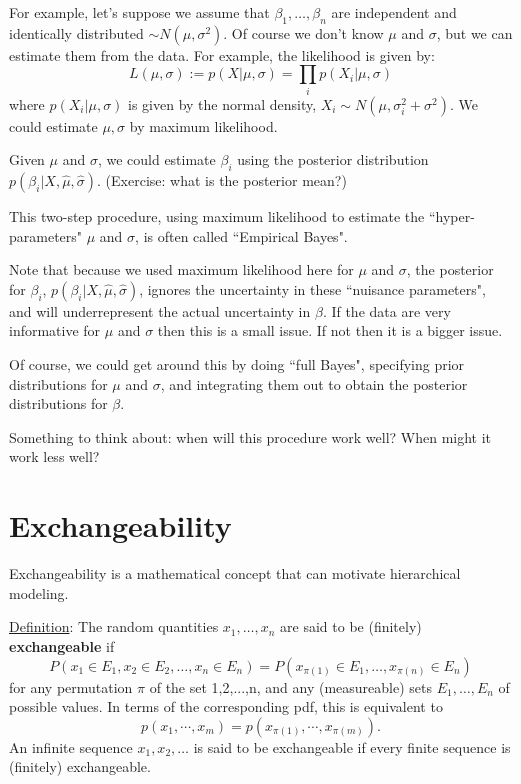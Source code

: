 \documentclass{article}
\begin{document}
 For example, let's suppose we assume that $\beta_1,\dots,\beta_n$ are independent and identically distributed $\sim N(\mu,\sigma^2)$. Of course
 we don't know $\mu$ and $\sigma$, but we can estimate them from the data.
 For example, the likelihood is given by:
 \begin{equation}
 L(\mu,\sigma) := p(X | \mu,\sigma) = \prod_i p(X_i | \mu, \sigma)
 \end{equation}
 where $p(X_i | \mu, \sigma)$ is given by the normal density, $X_i \sim N(\mu,\sigma_i^2 + \sigma^2)$. 
 We could estimate $\mu, \sigma$ by maximum likelihood.
 
 Given $\mu$ and $\sigma$, we could estimate $\beta_i$ using the posterior distribution $p(\beta_i | X, \hat\mu, \hat\sigma)$. (Exercise: what is the posterior mean?)
 
 This two-step procedure, using maximum likelihood to estimate the ``hyper-parameters" $\mu$ and $\sigma$, is often called ``Empirical Bayes".
 
 Note that because we used
 maximum likelihood here for $\mu$ and $\sigma$, the posterior for $\beta_i$, $p(\beta_i | X, \hat\mu, \hat\sigma)$, ignores the uncertainty in these ``nuisance parameters", and will underrepresent the actual uncertainty in $\beta$. If the data are very informative for $\mu$ and $\sigma$ then this is a small issue. If not then it is a bigger issue. 

Of course, we could get around this by doing ``full Bayes", specifying 
prior distributions for $\mu$ and $\sigma$, and integrating them out to
obtain the posterior distributions for $\beta$. 
 
Something to think about: when will this procedure work well?
When might it work less well?
 
 

\section{Exchangeability}

Exchangeability is a mathematical concept that can motivate hierarchical modeling.


\underline{Definition}:  The random quantities $x_1,\ldots,x_n$ are
said to be (finitely) {\bf exchangeable} if
$$P(x_1 \in E_1, x_2 \in E_2, \ldots, x_n \in E_n)
=P(x_{\pi(1)} \in E_1,\ldots ,x_{\pi(n)} \in E_n)$$
for any permutation $\pi$ of the set {1,2,...,n}, and any
(measureable) sets $E_1,\ldots,E_n$ of possible values.  In terms of
the corresponding pdf, this is equivalent to 
$$p(x_1,\cdots,x_m)=p(x_{\pi(1)},\cdots,x_{\pi(m)}).
$$
An infinite sequence $x_1,x_2,\ldots$ is said to be exchangeable if
every finite sequence is (finitely) exchangeable.
\end{document}
